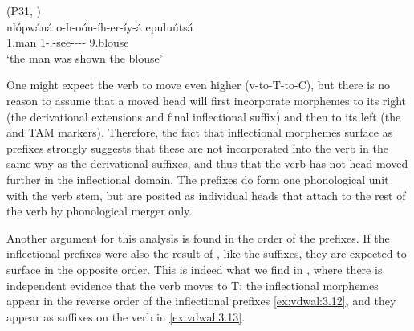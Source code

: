 \documentclass[output=paper]{langsci/langscibook}
\begin{document}
\ea\label{ex:vdwal:3.10}  (P31, \citealt[168--169]{vanderWal2009})\\
    \gll  nlópwáná  o-h-oón-íh-er-íy-á  epuluútsá\\
        1.man  1\Sm-\Pfv{}.\Dj{}-see-\Caus{}-\Appl{}-\Pass{}-\Fv{}  9.blouse\\
    \glt    ‘the man was shown the blouse’
\z

\ea\label{ex:vdwal:3.11}
\z
{}

One might expect the verb to move even higher (v-to-T-to-C), but there is no
reason to assume that a moved head will first incorporate morphemes to its
right (the derivational extensions and final inflectional suffix) and then to
its left (the  and \gls{TAM} markers). Therefore, the fact that
inflectional morphemes surface as prefixes strongly suggests that these are not
incorporated into the verb in the same way as the derivational suffixes, and
thus that the verb has not head-moved further in the inflectional domain. The
prefixes do form one phonological unit with the verb stem, but are posited as
individual heads that attach to the rest of the verb by phonological merger
only.

Another argument for this analysis is found in the order of the prefixes. If
the inflectional prefixes were also the result of , like the
suffixes, they are expected to surface in the opposite order. This is indeed
what we find in , where there is independent evidence that the verb moves
to T: the inflectional morphemes appear in the reverse order of the 
inflectional prefixes \eqref{ex:vdwal:3.12}, and they appear as suffixes on the verb
in \eqref{ex:vdwal:3.13}.
\end{document}
